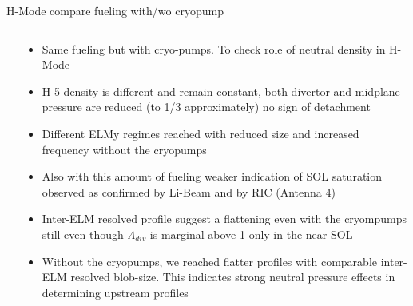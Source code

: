 \documentclass[10pt, compress]{beamer}
\newcommand\Fontvi{\fontsize{8}{7.2}\selectfont}
\begin{document}
\begin{frame}{H-Mode compare fueling with/wo
      cryopump}
    \Fontvi
  \vspace{-1cm}
  \begin{columns}
  \begin{column}{0.65\textwidth}
  \end{column}
  \begin{column}{0.35\textwidth}
    \begin{itemize}
    \item<1|only@1> Same fueling but with cryo-pumps. \alert{To check role
        of neutral density in H-Mode}
      \item<1|only@1> H-5 density is different and remain constant, both
        divertor and midplane pressure are reduced (to 1/3
        approximately) no sign of detachment
      \item<2|only@2> Different ELMy regimes reached with reduced size and
        increased frequency without the cryopumps
      \item<3|only@3> Also with this amount of fueling weaker indication of SOL
        saturation observed as confirmed by Li-Beam and by RIC (Antenna 4)
      \item<4|only@4> Inter-ELM resolved profile suggest a flattening even
        with the cryompumps still even though $\Lambda_{div}$ is
        marginal above 1 only in the near SOL
       \item<5|only@5> Without the cryopumps, we reached flatter
         profiles with comparable inter-ELM resolved blob-size. This
         indicates strong neutral pressure effects in determining
         upstream profiles
      \end{itemize}
  \end{column}
\end{columns}
\end{frame}
\end{document}
